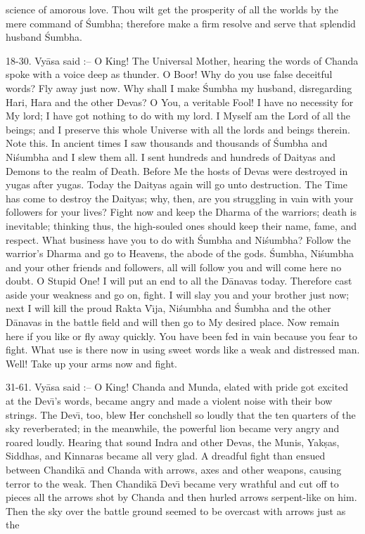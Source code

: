 science of amorous love. Thou wilt get the prosperity of all the worlds by the mere command of \'Sumbha; therefore make a firm resolve and serve that splendid husband \'Sumbha.

18-30. Vy\=asa said :-- O King! The Universal Mother, hearing the words of Chanda spoke with a voice deep as thunder. O Boor! Why do you use false deceitful words? Fly away just now. Why shall I make \'Sumbha my husband, disregarding Hari, Hara and the other Devas? O You, a veritable Fool! I have no necessity for My lord; I have got nothing to do with my lord. I Myself am the Lord of all the beings; and I preserve this whole Universe with all the lords and beings therein. Note this. In ancient times I saw thousands and thousands of \'Sumbha and Ni\'sumbha and I slew them all. I sent hundreds and hundreds of Daityas and Demons to the realm of Death. Before Me the hosts of Devas were destroyed in yugas after yugas. Today the Daityas again will go unto destruction. The Time has come to destroy the Daityas; why, then, are you struggling in vain with your followers for your lives? Fight now and keep the Dharma of the warriors; death is inevitable; thinking thus, the high-souled ones should keep their name, fame, and respect. What business have you to do with \'Sumbha and Ni\'sumbha? Follow the warrior's Dharma and go to Heavens, the abode of the gods. \'Sumbha, Ni\'sumbha and your other friends and followers, all will follow you and will come here no doubt. O Stupid One! I will put an end to all the D\=anavas today. Therefore cast aside your weakness and go on, fight. I will slay you and your brother just now; next I will kill the proud Rakta V\={\i}ja, Ni\'sumbha and \'Sumbha and the other D\=anavas in the battle field and will then go to My desired place. Now remain here if you like or fly away quickly. You have been fed in vain because you fear to fight. What use is there now in using sweet words like a weak and distressed man. Well! Take up your arms now and fight.

31-61. Vy\=asa said :-- O King! Chanda and Munda, elated with pride got excited at the Dev\={\i}'s words, became angry and made a violent noise with their bow strings. The Dev\={\i}, too, blew Her conchshell so loudly that the ten quarters of the sky reverberated; in the meanwhile, the powerful lion became very angry and roared loudly. Hearing that sound Indra and other Devas, the Munis, Yak\d{s}as, Siddhas, and Kinnaras became all very glad. A dreadful fight than ensued between Chandik\=a and Chanda with arrows, axes and other weapons, causing terror to the weak. Then Chandik\=a Dev\={\i} became very wrathful and cut off to pieces all the arrows shot by Chanda and then hurled arrows serpent-like on him. Then the sky over the battle ground seemed to be overcast with arrows just as the

